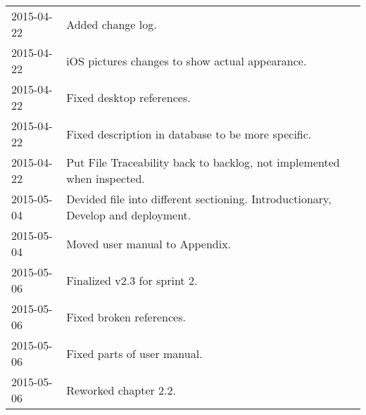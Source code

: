 
\begin{tabularx}{\textwidth}{lX}
	2015-04-22 & Added change log.\\
	2015-04-22 & iOS pictures changes to show actual appearance.\\
    2015-04-22 & Fixed desktop references. \\
	2015-04-22 & Fixed description in database to be more specific. \\
	2015-04-22 & Put File Traceability back to backlog, not implemented when inspected.\\
	2015-05-04 & Devided file into different sectioning. Introductionary, Develop and deployment. \\
	2015-05-04 & Moved user manual to Appendix.\\
	2015-05-06 & Finalized v2.3 for sprint 2. \\
	2015-05-06 & Fixed broken references. \\
	2015-05-06 & Fixed parts of user manual. \\
	2015-05-06 & Reworked chapter 2.2. \\
\end{tabularx}
